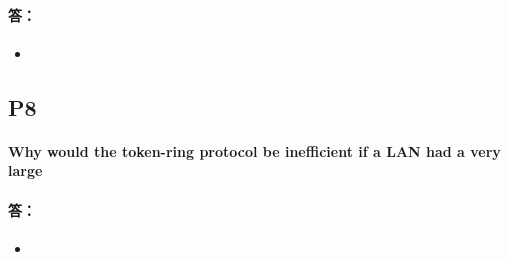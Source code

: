 \documentclass[a4paper]{ctexart}
\begin{document}
\paragraph*{答：} 
\begin{itemize}
    \item 
\end{itemize}

\subsection*{P8}
\paragraph*{Why would the token-ring protocol be inefficient if a LAN had a very large\\}
\paragraph*{答：} 
\begin{itemize}
    \item 
\end{itemize}
\end{document}

